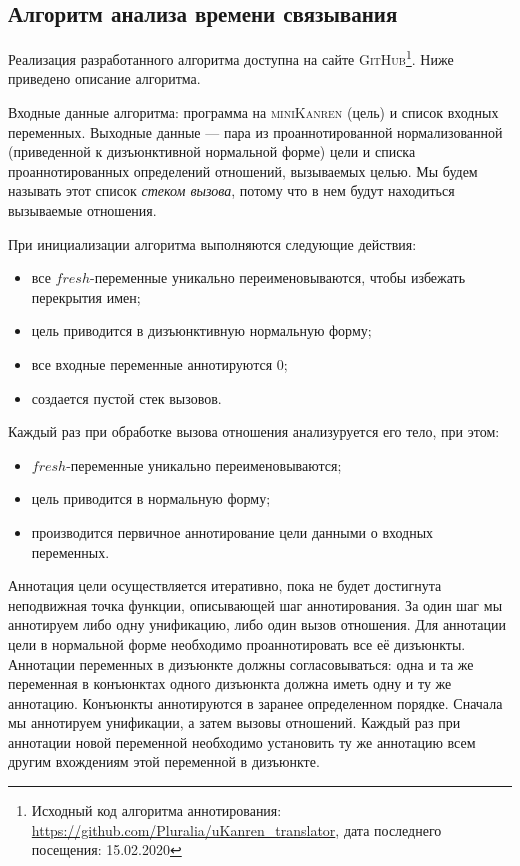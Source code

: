 \documentclass[conference,a4paper,american,russian]{IEEEtran}
\newcommand{\miniKanren}{\textsc{miniKanren}}
\newcommand{\github}{\textsc{GitHub}}
\begin{document}
\subsection{Алгоритм анализа времени связывания}

Реализация разработанного алгоритма доступна на сайте \github{}\footnote{Исходный код алгоритма аннотирования: \url{https://github.com/Pluralia/uKanren\_translator}, дата последнего посещения: 15.02.2020}. Ниже приведено описание алгоритма.

Входные данные алгоритма: программа на \miniKanren{} (цель) и список входных переменных.
Выходные данные --- пара из проаннотированной нормализованной (приведенной к дизъюнктивной нормальной форме) цели и списка проаннотированных определений отношений, вызываемых целью.
Мы будем называть этот список \emph{стеком вызова}, потому что в нем будут находиться вызываемые отношения.

При инициализации алгоритма выполняются следующие действия:
\begin{itemize}
    \item все $fresh$-переменные уникально переименовываются, чтобы избежать перекрытия имен;
    \item цель приводится в дизъюнктивную нормальную форму;
    \item все входные переменные аннотируются $0$;
    \item создается пустой стек вызовов.
\end{itemize}

Каждый раз при обработке вызова отношения анализуруется его тело, при этом:
\begin{itemize}
    \item $fresh$-переменные уникально переименовываются;
    \item цель приводится в нормальную форму;
    \item производится первичное аннотирование цели данными о входных переменных.
\end{itemize}

Аннотация цели осуществляется итеративно, пока не будет достигнута неподвижная точка функции, описывающей шаг аннотирования.
За один шаг мы аннотируем либо одну унификацию, либо один вызов отношения.
Для аннотации цели в нормальной форме необходимо проаннотировать все её дизъюнкты.
Аннотации переменных в дизъюнкте должны согласовываться: одна и та же переменная в конъюнктах одного дизъюнкта должна иметь одну и ту же аннотацию.
Конъюнкты аннотируются в заранее определенном порядке.
Сначала мы аннотируем унификации, а затем вызовы отношений.
Каждый раз при аннотации новой переменной необходимо установить ту же аннотацию всем другим вхождениям этой переменной в дизъюнкте.
\end{document}
